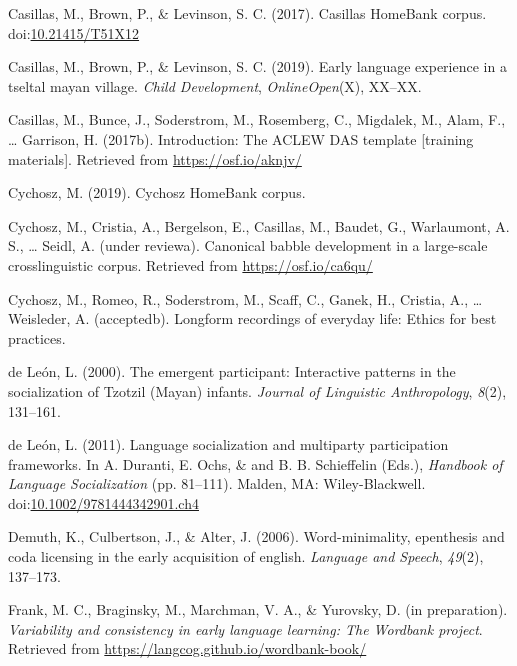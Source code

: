 \documentclass[,man,mask,floatsintext]{apa6}
\begin{document}
\hypertarget{ref-Casillas-HB}{}
Casillas, M., Brown, P., \& Levinson, S. C. (2017). Casillas HomeBank
corpus. doi:\href{https://doi.org/10.21415/T51X12}{10.21415/T51X12}

\hypertarget{ref-casillas2019early}{}
Casillas, M., Brown, P., \& Levinson, S. C. (2019). Early language
experience in a tseltal mayan village. \emph{Child Development},
\emph{OnlineOpen}(X), XX--XX.

\hypertarget{ref-casillas2017ACLEWDAS}{}
Casillas, M., Bunce, J., Soderstrom, M., Rosemberg, C., Migdalek, M.,
Alam, F., \ldots{} Garrison, H. (2017b). Introduction: The ACLEW DAS
template {[}training materials{]}. Retrieved from
\url{https://osf.io/aknjv/}

\hypertarget{ref-Cychosz-HB}{}
Cychosz, M. (2019). Cychosz HomeBank corpus.

\hypertarget{ref-cychoszURcanonical}{}
Cychosz, M., Cristia, A., Bergelson, E., Casillas, M., Baudet, G.,
Warlaumont, A. S., \ldots{} Seidl, A. (under reviewa). Canonical babble
development in a large-scale crosslinguistic corpus. Retrieved from
\url{https://osf.io/ca6qu/}

\hypertarget{ref-cychoszURlongform}{}
Cychosz, M., Romeo, R., Soderstrom, M., Scaff, C., Ganek, H., Cristia,
A., \ldots{} Weisleder, A. (acceptedb). Longform recordings of everyday
life: Ethics for best practices.

\hypertarget{ref-deleon2000emergent}{}
de León, L. (2000). The emergent participant: Interactive patterns in
the socialization of Tzotzil (Mayan) infants. \emph{Journal of
Linguistic Anthropology}, \emph{8}(2), 131--161.

\hypertarget{ref-deleon2011language}{}
de León, L. (2011). Language socialization and multiparty participation
frameworks. In A. Duranti, E. Ochs, \& and B. B. Schieffelin (Eds.),
\emph{Handbook of Language Socialization} (pp. 81--111). Malden, MA:
Wiley-Blackwell.
doi:\href{https://doi.org/10.1002/9781444342901.ch4}{10.1002/9781444342901.ch4}

\hypertarget{ref-demuth2006word}{}
Demuth, K., Culbertson, J., \& Alter, J. (2006). Word-minimality,
epenthesis and coda licensing in the early acquisition of english.
\emph{Language and Speech}, \emph{49}(2), 137--173.

\hypertarget{ref-frankIPvariability}{}
Frank, M. C., Braginsky, M., Marchman, V. A., \& Yurovsky, D. (in
preparation). \emph{Variability and consistency in early language
learning: The Wordbank project}. Retrieved from
\url{https://langcog.github.io/wordbank-book/}
\end{document}
